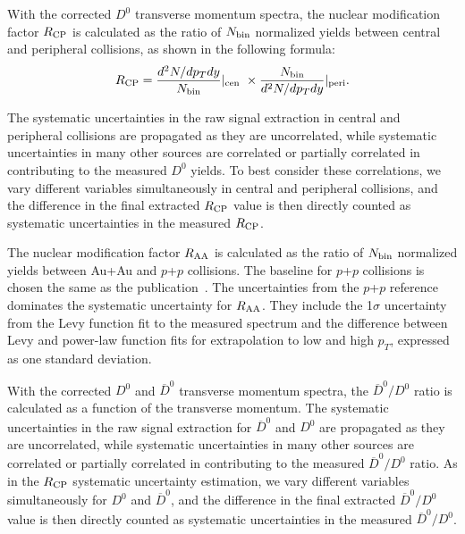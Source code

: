 \documentclass[%
 reprint,	
 amsmath,amssymb,
 aps,
 prc,
]{revtex4-1}
\begin{document}
With the corrected $D^0$ transverse momentum spectra, the nuclear modification factor $R_{\rm CP}$ is calculated as the ratio of $N_{\rm bin}$ normalized yields between central and peripheral collisions, as shown in the following formula:
\begin{equation}
  R_{\rm CP} = \frac{d^2N/dp_{T}dy}{N_{\rm bin}} |_{\rm cen\ } \times \frac{N_{\rm bin}} {d^2N/dp_{T}dy} |_{\rm peri }.
\label{equ:equation3}
\end{equation}

The systematic uncertainties in the raw signal extraction in central and peripheral collisions are propagated as they are uncorrelated, while systematic uncertainties in many other sources are correlated or partially correlated in contributing to the measured $D^0$ yields. To best consider these correlations, we vary different variables simultaneously in central and peripheral collisions, and the difference in the final extracted $R_{\rm CP}$ value is then directly counted as systematic uncertainties in the measured $R_{\rm CP}$.

The nuclear modification factor $R_{\rm AA}$ is calculated as the ratio of $N_{\rm bin}$ normalized yields between Au+Au and $p$+$p$ collisions. The baseline for $p$+$p$ collisions is chosen the same as the publication~\cite{Star_D_RAA}. The uncertainties from the $p$+$p$ reference dominates the systematic uncertainty for $R_{\rm AA}$. They include the 1$\sigma$ uncertainty from the Levy function fit to the measured spectrum and the difference between Levy and power-law function fits for extrapolation to low and high $p_T$, expressed as one standard deviation.

With the corrected $D^0$ and $\overline{D}^{0}$ transverse momentum spectra, the $\overline{D}^{0}/D^0$ ratio is calculated as a function of the transverse momentum. The systematic uncertainties in the raw signal extraction for $\overline{D}^{0}$ and $D^0$ are propagated as they are uncorrelated, while systematic uncertainties in many other sources are correlated or partially correlated in contributing to the measured $\overline{D}^{0}/D^0$ ratio. As in the $R_{\rm CP}$ systematic uncertainty estimation, we vary different variables simultaneously for $D^0$ and $\overline{D}^{0}$, and the difference in the final extracted $\overline{D}^{0}/D^0$ value is then directly counted as systematic uncertainties in the measured $\overline{D}^{0}/D^0$.
\end{document}
